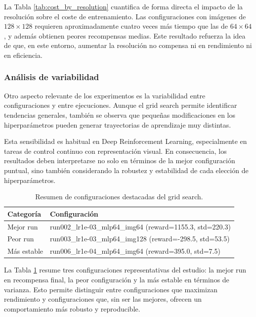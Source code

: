 \documentclass[10pt,twocolumn]{article}
\begin{document}
La Tabla \ref{tab:cost_by_resolution} cuantifica de forma directa el impacto de la resolución sobre el coste de entrenamiento. Las configuraciones con imágenes de \(128\times128\) requieren aproximadamente cuatro veces más tiempo que las de \(64\times64\), y además obtienen peores recompensas medias. Este resultado refuerza la idea de que, en este entorno, aumentar la resolución no compensa ni en rendimiento ni en eficiencia.

\subsubsection{Análisis de variabilidad}

Otro aspecto relevante de los experimentos es la variabilidad entre configuraciones y entre ejecuciones. Aunque el grid search permite identificar tendencias generales, también se observa que pequeñas modificaciones en los hiperparámetros pueden generar trayectorias de aprendizaje muy distintas.

Esta sensibilidad es habitual en Deep Reinforcement Learning, especialmente en tareas de control continuo con representación visual. En consecuencia, los resultados deben interpretarse no solo en términos de la mejor configuración puntual, sino también considerando la robustez y estabilidad de cada elección de hiperparámetros.

\begin{table}[H]
\centering
\caption{Resumen de configuraciones destacadas del grid search.}
\label{tab:grid_best_worst_stable}
\begin{tabular}{p{2.0cm}p{4.0cm}}
\toprule
Categoría & Configuración \\
\midrule
Mejor run & run002\_lr1e-03\_mlp64\_img64 (reward=1155.3, std=220.3) \\
Peor run & run003\_lr1e-03\_mlp64\_img128 (reward=-298.5, std=53.5) \\
Más estable & run006\_lr1e-04\_mlp64\_img64 (reward=395.0, std=7.5) \\
\bottomrule
\end{tabular}
\end{table}

La Tabla \ref{tab:grid_best_worst_stable} resume tres configuraciones representativas del estudio: la mejor run en recompensa final, la peor configuración y la más estable en términos de varianza. Esto permite distinguir entre configuraciones que maximizan rendimiento y configuraciones que, sin ser las mejores, ofrecen un comportamiento más robusto y reproducible.
\end{document}

